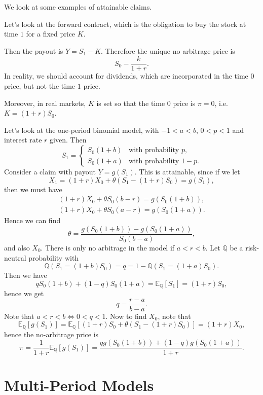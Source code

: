 \documentclass[12pt]{article}
\begin{document}

We look at some examples of attainable claims.

\begin{exbox}
	Let's look at the forward contract, which is the obligation to buy the stock at time $1$ for a fixed price $K$.

	Then the payout is $Y = S_1 - K$. Therefore the unique no arbitrage price is
	\[
	S_0 - \frac{k}{1 + r}.
	\]
	In reality, we should account for dividends, which are incorporated in the time $0$ price, but not the time $1$ price.

	Moreover, in real markets, $K$ is set so that the time 0 price is $\pi = 0$, i.e. $K = (1+r)S_0$.
\end{exbox}

\begin{exbox}
	Let's look at the one-period binomial model, with $-1 < a < b$, $0 < p < 1$ and interest rate $r$ given. Then
	\[
	S_1 =
	\begin{cases}
		S_0(1+b) &\text{with probability } p, \\
		S_0(1+a) &\text{with probability } 1-p.
	\end{cases}
	\]
	Consider a claim with payout $Y = g(S_1)$. This is attainable, since if we let
	\[
	X_1 = (1+r) X_0 + \theta(S_1 - (1+r)S_0) = g(S_1),
	\]
	then we must have
	\begin{align*}
		(1 + r)X_0 + \theta S_0(b - r) = g(S_0(1+b)),\\
		(1+r)X_0 + \theta S_0(a - r) = g(S_0(1+a)).
	\end{align*}
	Hence we can find
	\[
	\theta = \frac{g(S_0(1+b)) - g(S_0(1+a))}{S_0(b-a)},
	\]
	and also $X_0$. There is only no arbitrage in the model if $a < r < b$. Let $\mathbb{Q}$ be a risk-neutral probability with
	\[
	\mathbb{Q}(S_1 = (1+b)S_0) = q = 1 - \mathbb{Q}(S_1 = (1+a)S_0).
	\]
	Then we have
	\[
	q S_0(1+b) + (1-q)S_0 (1+a) = \mathbb{E}_{\mathbb{Q}}[S_1] = (1+r)S_0,
	\]
	hence we get
	\[
	q = \frac{r - a}{b - a}.
	\]
	Note that $a < r < b \iff 0 < q < 1$. Now to find $X_0$, note that
	\[
	\mathbb{E}_{\mathbb{Q}}[g(S_1)] = \mathbb{E}_{\mathbb{Q}}[(1+r)S_0 + \theta(S_1 - (1+r)S_0)] = (1+r)X_0,
	\]
	hence the no-arbitrage price is
	\[
	\pi = \frac{1}{1 + r} \mathbb{E}_{\mathbb{Q}}[g(S_1)] = \frac{q g(S_0(1+b)) + (1-q) g(S_0(1+a))}{1 + r}.
	\]
\end{exbox}

\newpage

\section{Multi-Period Models}
\label{sec:mult_models}
\end{document}
